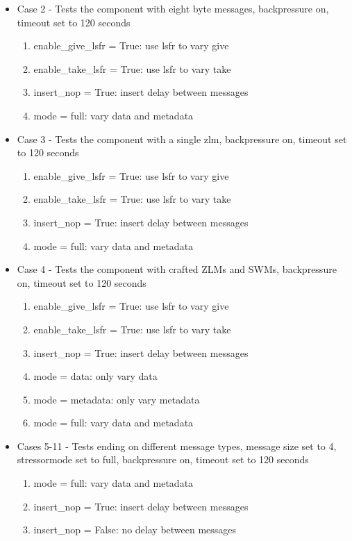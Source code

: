 \documentclass{article}
\begin{document}
\begin{flushleft}
\begin{itemize}
\item Case 2 - Tests the component with eight byte messages, backpressure on, timeout set to 120 seconds
\begin{enumerate}
	\item enable\_give\_lsfr = True: use lsfr to vary give
	\item enable\_take\_lsfr = True: use lsfr to vary take
	\item insert\_nop = True: insert delay between messages
	\item mode = full: vary data and metadata
\end{enumerate}

\item Case 3 - Tests the component with a single zlm, backpressure on, timeout set to 120 seconds
\begin{enumerate}
	\item enable\_give\_lsfr = True: use lsfr to vary give
	\item enable\_take\_lsfr = True: use lsfr to vary take
	\item insert\_nop = True: insert delay between messages
	\item mode = full: vary data and metadata
\end{enumerate}

\item Case 4 - Tests the component with crafted ZLMs and SWMs, backpressure on, timeout set to 120 seconds
\begin{enumerate}
	\item enable\_give\_lsfr = True: use lsfr to vary give
	\item enable\_take\_lsfr = True: use lsfr to vary take
	\item insert\_nop = True: insert delay between messages
  \item mode = data: only vary data
	\item mode = metadata: only vary metadata
	\item mode = full: vary data and metadata
\end{enumerate}

\item Cases 5-11 - Tests ending on different message types, message size set to 4, stressormode set to full, backpressure on, timeout set to 120 seconds
\begin{enumerate}
	\item mode = full: vary data and metadata
	\item insert\_nop = True: insert delay between messages
	\item insert\_nop = False: no delay between messages
\end{enumerate}


\end{itemize}
\end{flushleft}
\end{document}
